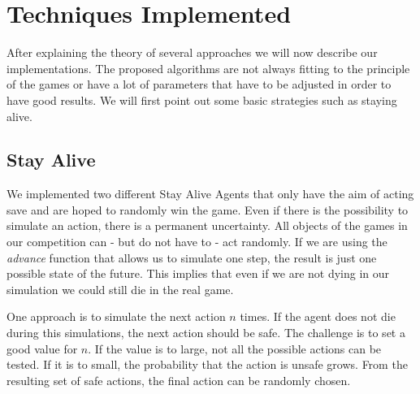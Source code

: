 \section{Techniques Implemented} 
\label{sec:exp}

After explaining the theory of several approaches we will now describe our implementations. The proposed algorithms are not always fitting to 
the principle of the games or have a lot of parameters that have to be adjusted in order to have good results. We will first point out some basic strategies
such as staying alive.


\subsection{Stay Alive} 

We implemented two different Stay Alive Agents that only have the aim of acting save and are hoped to randomly win the game.
Even if there is the possibility to simulate an action, there is a permanent uncertainty. All objects of the games in our competition
can - but do not have to - act randomly. If we are using the \textit{advance} function that allows us to simulate one step, the result is just one possible state of the future. This implies that even if we are not dying in our simulation we could still die in the real game.

One approach is to simulate the next action $n$ times. If the agent does not die during this simulations, the next action should be safe.
The challenge is to set a good value for $n$. If the value is to large, not all the possible actions can be tested. If it is to small, the probability that the action is unsafe grows.
From the resulting set of safe actions, the final action can be randomly chosen.

